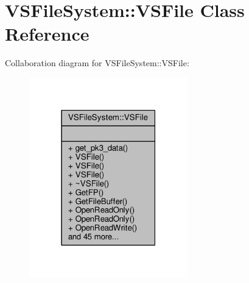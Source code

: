 \hypertarget{classVSFileSystem_1_1VSFile}{}\section{V\+S\+File\+System\+:\+:V\+S\+File Class Reference}
\label{classVSFileSystem_1_1VSFile}


Collaboration diagram for V\+S\+File\+System\+:\+:V\+S\+File\+:
\nopagebreak
\begin{figure}[H]
\begin{center}
\leavevmode
\includegraphics[width=195pt]{d3/d65/classVSFileSystem_1_1VSFile__coll__graph}
\end{center}
\end{figure}
